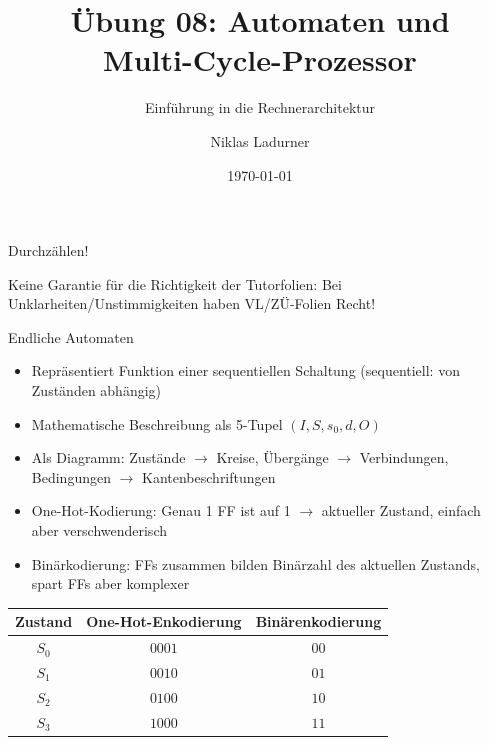 \documentclass[
  german,            %
  aspectratio=169,    %
]{tumbeamer}
\title{Übung 08: Automaten und \\Multi-Cycle-Prozessor}
\subtitle{Einführung in die Rechnerarchitektur}
\author{Niklas Ladurner}
\institute{\theChairName\\\theDepartmentName\\\theUniversityName}
\date[\today]{\today}
\begin{document}
\maketitle

\begin{frame}[c]{}{}
  \begin{center}
    \LARGE  Durchzählen!
  \end{center}
\end{frame}

\begin{frame}[c]{}{}
  \begin{center}
    \LARGE  Keine Garantie für die Richtigkeit der Tutorfolien: Bei Unklarheiten/Unstimmigkeiten
    haben VL/ZÜ-Folien Recht!
  \end{center}
\end{frame}

\begin{frame}[fragile, c]{Endliche Automaten}{}
  \begin{itemize}
    \item Repräsentiert Funktion einer sequentiellen Schaltung (sequentiell: von Zuständen abhängig)
    \item Mathematische Beschreibung als 5-Tupel $(I, S, s_0, d, O)$
    \item Als Diagramm: Zustände $\rightarrow$ Kreise, Übergänge $\rightarrow$ Verbindungen, Bedingungen $\rightarrow$ Kantenbeschriftungen
    \item One-Hot-Kodierung: Genau 1 FF ist auf 1 $\rightarrow$ aktueller Zustand, einfach aber verschwenderisch
    \item Binärkodierung: FFs zusammen bilden Binärzahl des aktuellen Zustands, spart FFs aber komplexer
  \end{itemize}
  \begin{table}[]
    \begin{tabular}{c|c|c}
    Zustand & One-Hot-Enkodierung & Binärenkodierung \\ \hline
    $S_0$    & $0001$                & $00$               \\
    $S_1$    & $0010$                & $01$               \\
    $S_2$    & $0100$                & $10$               \\
    $S_3$    & $1000$                & $11$              
    \end{tabular}
    \end{table}
\end{frame}
\end{document}
